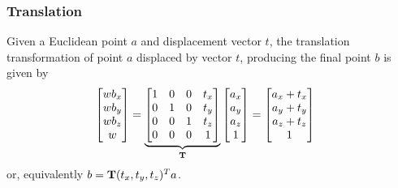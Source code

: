 \documentclass[11pt]{article}
\begin{document}
\begin{multicols}{2}

\subsubsection{Translation}
Given a Euclidean point $a$ and displacement vector $t$, the translation
transformation of point $a$ displaced by vector $t$, producing the final point
$b$ is given by
\scriptsize
\begin{align}
    \begin{bmatrix}
        w b_x \\
        w b_y \\
        w b_z \\
        w
    \end{bmatrix}
    &=
    \underbrace{
    \begin{bmatrix}
        1 & 0 & 0 & t_x \\
        0 & 1 & 0 & t_y \\
        0 & 0 & 1 & t_z \\
        0 & 0 & 0 & 1 \\
    \end{bmatrix}}_{\text{\bf T}}
    \begin{bmatrix}
        a_x \\
        a_y \\
        a_z \\
        1
    \end{bmatrix}
    =
    \begin{bmatrix}
        a_x + t_x \\
        a_y + t_y \\
        a_z + t_z \\
        1
    \end{bmatrix}
\end{align}
\normalsize
or, equivalently $b = \text{\bf T}(t_x, t_y, t_z)^T a$.


\vfill\columnbreak


\end{multicols}
\end{document}
